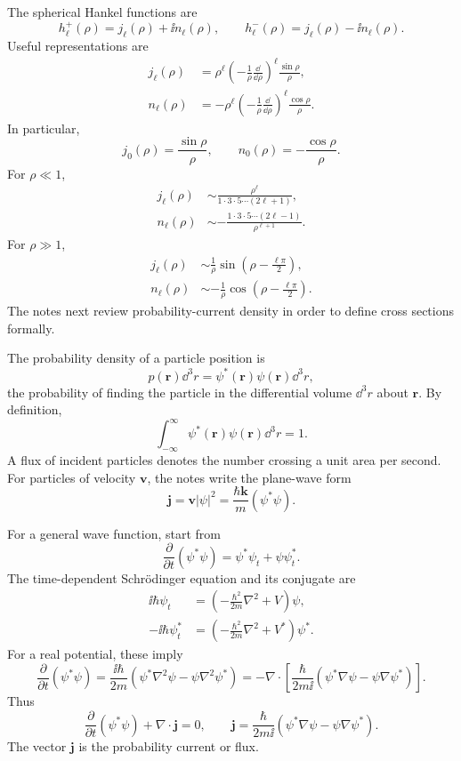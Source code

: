 The spherical Hankel functions are
\[
  h_\ell^+(\rho)=j_\ell(\rho)+\ii n_\ell(\rho),
  \qquad
  h_\ell^-(\rho)=j_\ell(\rho)-\ii n_\ell(\rho).
\]
Useful representations are
\begin{align*}
  j_\ell(\rho)
  &=\rho^\ell\left(-\frac{1}{\rho}\frac{\dd}{\dd\rho}\right)^\ell
  \frac{\sin\rho}{\rho},\\
  n_\ell(\rho)
  &=-\rho^\ell\left(-\frac{1}{\rho}\frac{\dd}{\dd\rho}\right)^\ell
  \frac{\cos\rho}{\rho}.
\end{align*}
In particular,
\[
  j_0(\rho)=\frac{\sin\rho}{\rho},
  \qquad
  n_0(\rho)=-\frac{\cos\rho}{\rho}.
\]
For $\rho\ll1$,
\begin{align*}
  j_\ell(\rho)&\sim
  \frac{\rho^\ell}{1\cdot3\cdot5\cdots(2\ell+1)},\\
  n_\ell(\rho)&\sim
  -\frac{1\cdot3\cdot5\cdots(2\ell-1)}{\rho^{\ell+1}}.
\end{align*}
For $\rho\gg1$,
\begin{align*}
  j_\ell(\rho)&\sim \frac{1}{\rho}\sin\left(\rho-\frac{\ell\pi}{2}\right),\\
  n_\ell(\rho)&\sim-\frac{1}{\rho}\cos\left(\rho-\frac{\ell\pi}{2}\right).
\end{align*}
The notes next review probability-current density in order to define cross sections formally.

The probability density of a particle position is
\[
  p(\bm r)\dd^3r=\psi^*(\bm r)\psi(\bm r)\dd^3r,
\]
the probability of finding the particle in the differential volume $\dd^3r$ about $\bm r$.  By definition,
\[
  \int_{-\infty}^{\infty}\psi^*(\bm r)\psi(\bm r)\dd^3r=1.
\]
A flux of incident particles denotes the number crossing a unit area per second.  For particles of velocity $\bm v$, the notes write the plane-wave form
\[
  \bm j=\bm v|\psi|^2
  =\frac{\hbar\bm k}{m}(\psi^*\psi).
\]

For a general wave function, start from
\[
  \frac{\partial}{\partial t}(\psi^*\psi)
  =\psi^*\psi_t+\psi\psi_t^*.
\]
The time-dependent Schr\"odinger equation and its conjugate are
\begin{align*}
  \ii\hbar\psi_t&=\left(-\frac{\hbar^2}{2m}\nabla^2+V\right)\psi,\\
  -\ii\hbar\psi_t^*&=\left(-\frac{\hbar^2}{2m}\nabla^2+V^*\right)\psi^*.
\end{align*}
For a real potential, these imply
\[
  \frac{\partial}{\partial t}(\psi^*\psi)
  =\frac{\ii\hbar}{2m}
  \left(\psi^*\nabla^2\psi-\psi\nabla^2\psi^*\right)
  =-\nabla\cdot\left[
  \frac{\hbar}{2m\ii}
  (\psi^*\nabla\psi-\psi\nabla\psi^*)\right].
\]
Thus
\begin{equation}
  \frac{\partial}{\partial t}(\psi^*\psi)+\nabla\cdot\bm j=0,
  \qquad
  \bm j=\frac{\hbar}{2m\ii}
  (\psi^*\nabla\psi-\psi\nabla\psi^*).
  \label{eq:qs-continuity}
\end{equation}
The vector $\bm j$ is the probability current or flux.

